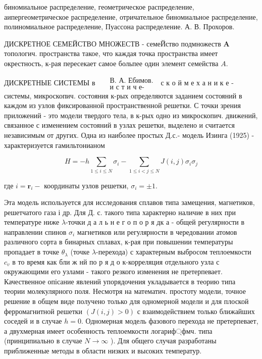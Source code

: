 \documentclass[10pt]{article}
\begin{document}
биномиальное распределение, геометрическое распределение, аипергеометрическое распределение, отричательное биномиальное распределение, полиномиальное распределение, Пуассона распределение. А. В. Прохоров.



ДИСКРЕТНОЕ СЕМЕЙСТВО МНОЖЕСТВ - семеЙство подмножеств $\boldsymbol{A}$ топологич. пространства такое, что каждая точка пространства имеет окрестность, к-рая пересекает самое больпее один элемент семейства $A$.



ДИСКРЕТНЫЕ СИСТЕМЫ в $\quad \begin{array}{r}\text { В. А. Ебимов. } \\ \text { и с т и ч е- }\end{array}$ с к о й м е х а н и к е - системы, микроскопич. состояния к-рых определяются заданием состояний в каждом из узлов фиксированной пространственной решетки. С точки зрения приложений - это модели твердого тела, в к-рых одно из микроскопич. движений, связанное с изменением состояний в узлах решетки, выделено и считается независимым от других. Одна из наиболее простых Д.с.- модель Изинга (1925) - характеризуется гамильтонианом



\[

H=-h \sum_{1 \leqslant i \leqslant N} \sigma_{i}-\sum_{1 \leqslant i<j \leqslant N} J(i, j) \sigma_{i} \sigma_{j}

\]



где $i=\boldsymbol{r}_{i}-$ координаты узлов решетки, $\sigma_{i}= \pm 1$.



Эта модель используется для исследования сплавов типа замещения, магнетиков, решетчатого газа і др. Для Д. с. такого типа характерно наличие в них при температуре ниже $\lambda$-точки д а л ь н е г о п о р я дк а - общей регулярности в направлении спинов $\sigma_{i}$ магнетиков или регулярности в чередовании атомов различного сорта в бинарных сплавах, к-рая при повышении температуры пропадает в точке $\theta_{\lambda}$ (точке $\lambda$-перехода) с характерным выбросом теплоемкости $c_{v}$ в то время как бли ж нй по р я д о к-корреляция отдельного узла с окружающими его узлами - такого резкого изменения не претерпевает. Качественное опісание явлений упорядочения укладывается в теорию типа теории молекулярного поля. Несмотря на математич. простоту модели, точное решение в общем виде получено только для одномерной модели и для плоской ферромагнитной решетки $(J(i, j)>0)$ с взаимодействием только ближайших соседей и в случае $h=0$. Одномерная модель фазового перехода не претерпевает, а двухмерная имеет особенность теплоемкости логариф্фмч. типа (принципиально в случае $N \rightarrow \infty$ ). Для общего случая разработаны приближенные методы в области низких и высоких температур.
\end{document}
